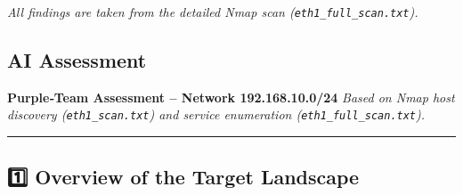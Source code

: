 \emph{All findings are taken from the detailed Nmap scan
(\texttt{eth1\_full\_scan.txt}).}

\subsection{AI Assessment}\label{ai-assessment}

\textbf{Purple‑Team Assessment -- Network 192.168.10.0/24} \emph{Based
on Nmap host discovery (\texttt{eth1\_scan.txt}) and service enumeration
(\texttt{eth1\_full\_scan.txt}).}

\begin{center}\rule{0.5\linewidth}{0.5pt}\end{center}

\subsection{1️⃣ Overview of the Target
Landscape}\label{overview-of-the-target-landscape}

